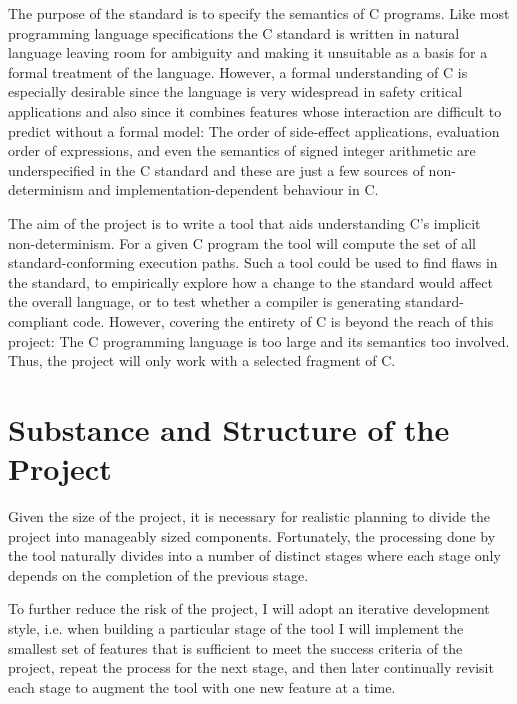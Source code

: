\documentclass[a4paper,12pt]{scrbook}
\theoremstyle{plain}
\theoremstyle{definition}
\begin{document}
The purpose of the standard is to specify the semantics of C programs. Like most programming language specifications the C standard is written in natural language leaving room for ambiguity and making it unsuitable as a basis for a formal treatment of the language. However, a formal understanding of C is especially desirable since the language is very widespread in safety critical applications and also since it combines features whose interaction are difficult to predict without a formal model: The order of side-effect applications, evaluation order of expressions, and even the semantics of signed integer arithmetic are underspecified in the C standard and these are just a few sources of non-determinism and implementation-dependent behaviour in C.

The aim of the project is to write a tool that aids understanding C's implicit non-determinism. For a given C program the tool will compute the set of all standard-conforming execution paths. Such a tool could be used to find flaws in the standard, to empirically explore how a change to the standard would affect the overall language, or to test whether a compiler is generating standard-compliant code. However, covering the entirety of C is beyond the reach of this project: The C programming language is too large and its semantics too involved. Thus, the project will only work with a selected fragment of C.

\section*{Substance and Structure of the Project}
Given the size of the project, it is necessary for realistic planning to divide the project into manageably sized components. Fortunately, the processing done by the tool naturally divides into a number of distinct stages where each stage only depends on the completion of the previous stage.

To further reduce the risk of the project, I will adopt an iterative development style, i.e. when building a particular stage of the tool I will implement the smallest set of features that is sufficient to meet the success criteria of the project, repeat the process for the next stage, and then later continually revisit each stage to augment the tool with one new feature at a time.
\end{document}
